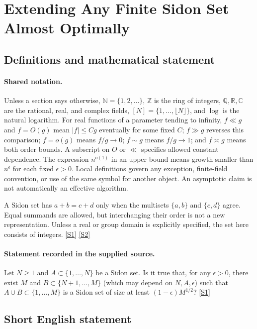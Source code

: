 \documentclass[11pt,a4paper]{article}
\newcommand{\N}{\mathbb{N}}
\newcommand{\Z}{\mathbb{Z}}
\newcommand{\Q}{\mathbb{Q}}
\newcommand{\R}{\mathbb{R}}
\newcommand{\C}{\mathbb{C}}
\newcommand{\sref}[2]{\hyperlink{source:#1:#2}{[S#2]}}
\begin{document}
\section{Extending Any Finite Sidon Set Almost Optimally}\label{statement}


\subsection{Definitions and mathematical statement}

\paragraph{Shared notation.}Unless a section says otherwise, $\N=\{1,2,\ldots\}$,
$\Z$ is the ring of integers, $\Q,\R,\C$ are the rational, real, and complex
fields, $[N]=\{1,\ldots,\lfloor N\rfloor\}$, and $\log$ is the natural
logarithm. For real functions of a parameter tending to infinity,
$f\ll g$ and $f=O(g)$ mean $|f|\leq Cg$ eventually for some fixed $C$;
$f\gg g$ reverses this comparison; $f=o(g)$ means $f/g\to0$;
$f\sim g$ means $f/g\to1$; and $f\asymp g$ means both order bounds.
A subscript on $O$ or $\ll$ specifies allowed constant dependence.
The expression $n^{o(1)}$ in an upper bound means growth smaller than
$n^\epsilon$ for each fixed $\epsilon>0$. Local definitions govern any
exception, finite-field convention, or use of the same symbol for another
object. An asymptotic claim is not automatically an effective algorithm.



A Sidon set has $a+b=c+d$ only when the multisets $\{a,b\}$ and $\{c,d\}$ agree. Equal summands are allowed, but interchanging their order is not a new representation. Unless a real or group domain is explicitly specified, the set here consists of integers. \sref{statement}{1} \sref{statement}{2}

\paragraph{Statement recorded in the supplied source.}
Let $N\geq 1$ and $A\subset \{1,\ldots,N\}$ be a Sidon set. Is it true that, for any $\epsilon>0$, there exist $M$ and $B\subset \{N+1,\ldots,M\}$ (which may depend on $N,A,\epsilon$) such that $A\cup B\subset \{1,\ldots,M\}$ is a Sidon set of size at least $(1-\epsilon)M^{1/2}$? \sref{statement}{1}

\subsection{Short English statement}
\end{document}
